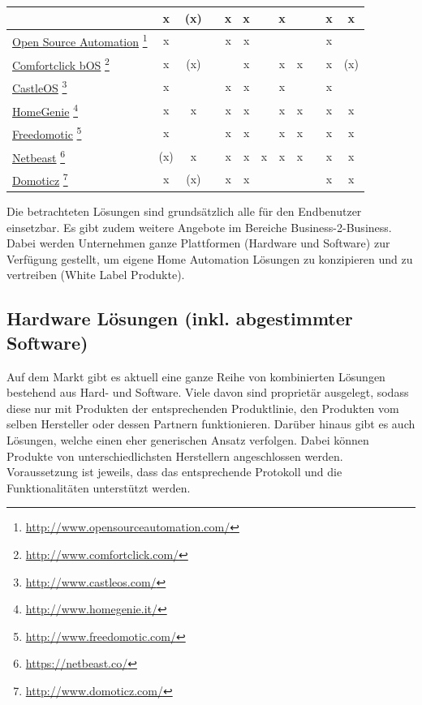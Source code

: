 \begin{longtable}{R{4cm} | c  | c | c | c | c | c | c | c | c | c | c}
	&	x
	&  (x)
	&
	&	x
	&	x
	&
	&	x
	&
	&
	& 	x 
	&   x\\
\midrule
\hyperlink{http://www.opensourceautomation.com/}{Open Source Automation} \footnote{\url{http://www.opensourceautomation.com/}}	
	&	x
	&	
	&	
	&	x
	&	x
	&	
	&	\footnotemark[12]
	&	\footnotemark[12]
	&
	&	x 
	& \\
\midrule
\hyperlink{http://www.comfortclick.com/}{Comfortclick bOS} \footnote{\url{http://www.comfortclick.com/}}	
	&	x
	&	(x)
	&	
	&	\footnotemark[12]
	&	x
	&	
	&	x
	&	x
	&
	&	x 
	&   (x)\footnotemark[13]\\
\midrule
\hyperlink{http://www.castleos.com/}{CastleOS} \footnote{\url{http://www.castleos.com/}}	
	&	x
	&	
	&	
	&	x
	&	x
	&	
	&	x
	&	
	&		
	&	x
	& 	\\
\midrule 
\hyperlink{http://www.homegenie.it/}{HomeGenie} \footnote{\url{http://www.homegenie.it/}}	
	& x
	& x
	& 
	& x
	& x
	& 
	& x
	& x
	& 
	& x
	& x\\
	
\midrule
\hyperlink{http://www.freedomotic.com/}{Freedomotic} \footnote{\url{http://www.freedomotic.com/}}	
	& x
	& 
	& 
	& x\footnotemark[11]
	& x
	& 
	& x
	& x
	& 
	& x
	& x\\
	
\midrule
\hyperlink{https://netbeast.co/}{Netbeast} \footnote{\url{https://netbeast.co/}}	
	& (x)
	& x
	& 
	& x
	& x
	& x
	& x
	& x
	& 
	& x
	& x \\
	
\midrule
\hyperlink{http://www.domoticz.com/}{Domoticz} \footnote{\url{http://www.domoticz.com/}}	
	& x
	& (x)
	& 
	& x
	& x
	& 
	& \footnotemark[12]
	& \footnotemark[12]
	& 
	& x
	& x\\
\bottomrule
\end{longtable}


\newpage
Die betrachteten Lösungen sind grundsätzlich alle für den Endbenutzer einsetzbar. Es gibt zudem weitere Angebote im Bereiche Business-2-Business. Dabei werden Unternehmen ganze Plattformen (Hardware und Software) zur Verfügung gestellt, um eigene Home Automation Lösungen zu konzipieren und zu vertreiben (White Label Produkte).

\subsection{Hardware Lösungen (inkl. abgestimmter Software)}
Auf dem Markt gibt es aktuell eine ganze Reihe von kombinierten Lösungen bestehend aus Hard- und Software. Viele davon sind proprietär ausgelegt, sodass diese nur mit Produkten der entsprechenden Produktlinie, den Produkten vom selben Hersteller oder dessen Partnern funktionieren. Darüber hinaus gibt es auch Lösungen, welche einen eher generischen Ansatz verfolgen. Dabei können Produkte von unterschiedlichsten Herstellern angeschlossen werden. Voraussetzung ist jeweils, dass das entsprechende Protokoll und die Funktionalitäten unterstützt werden.

